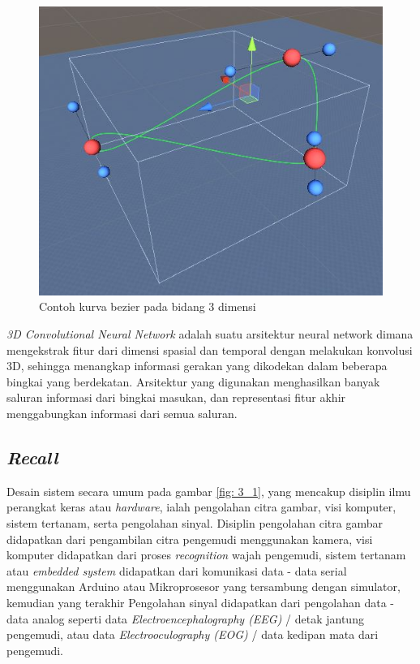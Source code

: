 \begin{figure} [H]
	\captionsetup{justification=centering}
	\includegraphics[scale=0.2]{img/contoh-kurva-bezier.JPG}
	\caption{Contoh kurva bezier pada bidang 3 dimensi}
	\label{fig:2.1}
\end{figure}

\textit{3D Convolutional Neural Network} adalah suatu arsitektur neural network dimana mengekstrak fitur dari dimensi spasial dan temporal dengan melakukan konvolusi 3D, sehingga menangkap informasi gerakan yang dikodekan dalam beberapa bingkai yang berdekatan. Arsitektur yang digunakan menghasilkan banyak saluran informasi dari bingkai masukan, dan representasi fitur akhir menggabungkan informasi dari semua saluran.
\vspace{1ex}

\subsection{\textit{Recall}}
Desain sistem secara umum pada gambar \ref{fig: 3_1}, yang mencakup disiplin ilmu perangkat keras atau \textit{hardware}, ialah pengolahan citra gambar, visi komputer, sistem tertanam, serta pengolahan sinyal. Disiplin pengolahan citra gambar didapatkan dari pengambilan citra pengemudi menggunakan kamera, visi komputer didapatkan dari proses \textit{recognition} wajah pengemudi, sistem tertanam atau \textit{embedded system} didapatkan dari komunikasi data - data serial menggunakan Arduino atau Mikroprosesor yang tersambung dengan simulator, kemudian yang terakhir Pengolahan sinyal didapatkan dari pengolahan data - data analog seperti data \textit{Electroencephalography (EEG)} / detak jantung pengemudi, atau data \textit{Electrooculography (EOG)} / data kedipan mata dari pengemudi.
\vspace{1ex}

